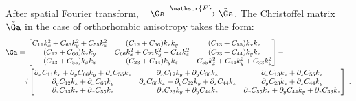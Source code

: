 After spatial Fourier transform, $-\Ga \xrightarrow{\mathscr{F}} \tilde{\Ga}$. The Christoffel matrix $\tilde{\Ga}$ in the case of orthorhombic anisotropy takes the form:
\begin{align}
  \tilde{\Ga} 
  &=
  \begin{bmatrix}
    C_{11}k_x^2+C_{66}k_y^2+C_{55}k_z^2 & (C_{12}+C_{66})k_xk_y & (C_{13}+C_{55})k_xk_z \\
    (C_{12}+C_{66})k_xk_y & C_{66}k_x^2+C_{22}k_y^2+C_{44}k_z^2 & (C_{23}+C_{44})k_yk_z  \\
    (C_{13}+C_{55})k_xk_z & (C_{23}+C_{44})k_yk_z & C_{55}k_x^2+C_{44}k_y^2+C_{33}k_z^2
  \end{bmatrix} - \\ \nonumber
  &\ \hphantom{=} i
  \begin{bmatrix}
      \partial_xC_{11}k_x+\partial_yC_{66}k_y+\partial_zC_{55}k_z & \partial_xC_{12}k_y+\partial_yC_{66}k_x & \partial_xC_{13}k_z+\partial_zC_{55}k_x \\
      \partial_yC_{12}k_x+\partial_xC_{66}k_y & \partial_xC_{66}k_x+\partial_yC_{22}k_y+\partial_zC_{44}k_z & \partial_yC_{23}k_z+\partial_zC_{44}k_y \\
      \partial_zC_{13}k_x+\partial_xC_{55}k_z & \partial_zC_{23}k_y+\partial_yC_{44}k_z & \partial_xC_{55}k_x+\partial_yC_{44}k_y+\partial_zC_{33}k_z
  \end{bmatrix}
  \;. 
\end{align}


